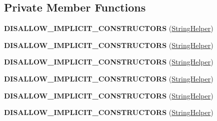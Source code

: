 \subsection*{Private Member Functions}
\begin{DoxyCompactItemize}
\item 
{\bfseries D\+I\+S\+A\+L\+L\+O\+W\+\_\+\+I\+M\+P\+L\+I\+C\+I\+T\+\_\+\+C\+O\+N\+S\+T\+R\+U\+C\+T\+O\+RS} (\hyperlink{classv8_1_1internal_1_1_string_helper}{String\+Helper})\hypertarget{classv8_1_1internal_1_1_string_helper_ac12d8297ee45e6afe2b9a1f983199786}{}\label{classv8_1_1internal_1_1_string_helper_ac12d8297ee45e6afe2b9a1f983199786}

\item 
{\bfseries D\+I\+S\+A\+L\+L\+O\+W\+\_\+\+I\+M\+P\+L\+I\+C\+I\+T\+\_\+\+C\+O\+N\+S\+T\+R\+U\+C\+T\+O\+RS} (\hyperlink{classv8_1_1internal_1_1_string_helper}{String\+Helper})\hypertarget{classv8_1_1internal_1_1_string_helper_ac12d8297ee45e6afe2b9a1f983199786}{}\label{classv8_1_1internal_1_1_string_helper_ac12d8297ee45e6afe2b9a1f983199786}

\item 
{\bfseries D\+I\+S\+A\+L\+L\+O\+W\+\_\+\+I\+M\+P\+L\+I\+C\+I\+T\+\_\+\+C\+O\+N\+S\+T\+R\+U\+C\+T\+O\+RS} (\hyperlink{classv8_1_1internal_1_1_string_helper}{String\+Helper})\hypertarget{classv8_1_1internal_1_1_string_helper_ac12d8297ee45e6afe2b9a1f983199786}{}\label{classv8_1_1internal_1_1_string_helper_ac12d8297ee45e6afe2b9a1f983199786}

\item 
{\bfseries D\+I\+S\+A\+L\+L\+O\+W\+\_\+\+I\+M\+P\+L\+I\+C\+I\+T\+\_\+\+C\+O\+N\+S\+T\+R\+U\+C\+T\+O\+RS} (\hyperlink{classv8_1_1internal_1_1_string_helper}{String\+Helper})\hypertarget{classv8_1_1internal_1_1_string_helper_ac12d8297ee45e6afe2b9a1f983199786}{}\label{classv8_1_1internal_1_1_string_helper_ac12d8297ee45e6afe2b9a1f983199786}

\item 
{\bfseries D\+I\+S\+A\+L\+L\+O\+W\+\_\+\+I\+M\+P\+L\+I\+C\+I\+T\+\_\+\+C\+O\+N\+S\+T\+R\+U\+C\+T\+O\+RS} (\hyperlink{classv8_1_1internal_1_1_string_helper}{String\+Helper})\hypertarget{classv8_1_1internal_1_1_string_helper_ac12d8297ee45e6afe2b9a1f983199786}{}\label{classv8_1_1internal_1_1_string_helper_ac12d8297ee45e6afe2b9a1f983199786}

\item 
{\bfseries D\+I\+S\+A\+L\+L\+O\+W\+\_\+\+I\+M\+P\+L\+I\+C\+I\+T\+\_\+\+C\+O\+N\+S\+T\+R\+U\+C\+T\+O\+RS} (\hyperlink{classv8_1_1internal_1_1_string_helper}{String\+Helper})\hypertarget{classv8_1_1internal_1_1_string_helper_ac12d8297ee45e6afe2b9a1f983199786}{}\label{classv8_1_1internal_1_1_string_helper_ac12d8297ee45e6afe2b9a1f983199786}


\end{DoxyCompactItemize}
